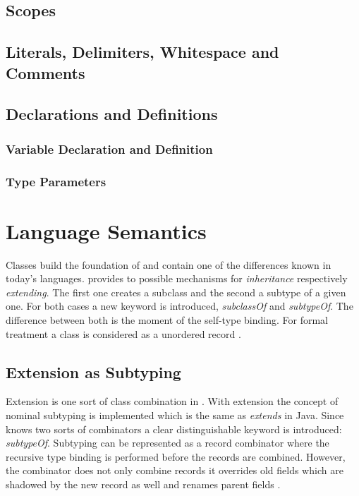 \section{Scopes}


\section{Literals, Delimiters, Whitespace and Comments}

\section{Declarations and Definitions}
\subsection{Variable Declaration and Definition}
\subsection{Type Parameters}

\chapter{Language Semantics}
Classes build the foundation of \ooplss and contain one of the
differences known in today's languages. \ooplss provides to possible
mechanisms for \emph{inheritance} respectively \emph{extending}. The
first one creates a subclass and the second a subtype of a given
one. For both cases a new keyword is introduced, \emph{subclassOf}
and \emph{subtypeOf}. The difference between both is the moment of
the self-type binding. For formal treatment a class is considered as a
unordered record \cite{simons_theory_2002-1}.

\section{Extension as Subtyping}
Extension is one sort of class combination in \ooplss. With extension the concept
of nominal subtyping is implemented which is the same as \emph{extends} in Java.
Since \ooplss knows two sorts of combinators a clear distinguishable keyword is
introduced: \emph{subtypeOf}. Subtyping can be represented as a record combinator
where the recursive type binding is performed before the records are combined.
However, the combinator does not only combine records it overrides old
fields which are shadowed by the new record as well and renames parent
fields \cite{simons_theory_2003-2}.

